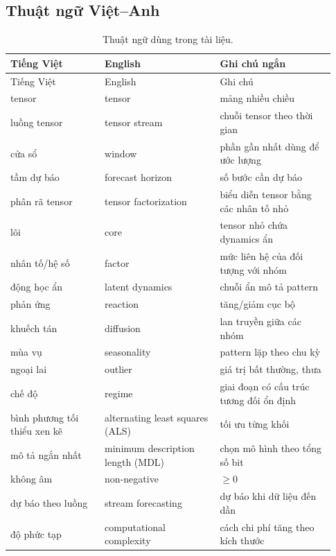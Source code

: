 \subsection*{Thuật ngữ Việt--Anh}

\begin{longtable}{@{}>{\raggedright\arraybackslash}p{0.27\linewidth}>{\raggedright\arraybackslash}p{0.33\linewidth}>{\raggedright\arraybackslash}p{0.33\linewidth}@{}}
  \caption{Thuật ngữ dùng trong tài liệu.}\label{tab:glossary}\\
  \toprule
  Tiếng Việt & English & Ghi chú ngắn \\
  \midrule
  \endfirsthead
  \toprule
  Tiếng Việt & English & Ghi chú \\
  \midrule
  \endhead
  tensor & tensor & mảng nhiều chiều \\
  luồng tensor & tensor stream & chuỗi tensor theo thời gian \\
  cửa sổ & window & phần gần nhất dùng để ước lượng \\
  tầm dự báo & forecast horizon & số bước cần dự báo \\
  phân rã tensor & tensor factorization & biểu diễn tensor bằng các nhân tố nhỏ \\
  lõi & core & tensor nhỏ chứa dynamics ẩn \\
  nhân tố/hệ số & factor & mức liên hệ của đối tượng với nhóm \\
  động học ẩn & latent dynamics & chuỗi ẩn mô tả pattern \\
  phản ứng & reaction & tăng/giảm cục bộ \\
  khuếch tán & diffusion & lan truyền giữa các nhóm \\
  mùa vụ & seasonality & pattern lặp theo chu kỳ \\
  ngoại lai & outlier & giá trị bất thường, thưa \\
  chế độ & regime & giai đoạn có cấu trúc tương đối ổn định \\
  bình phương tối thiểu xen kẽ & alternating least squares (ALS) & tối ưu từng khối \\
  mô tả ngắn nhất & minimum description length (MDL) & chọn mô hình theo tổng số bit \\
  không âm & non-negative & $\ge 0$ \\
  dự báo theo luồng & stream forecasting & dự báo khi dữ liệu đến dần \\
  độ phức tạp & computational complexity & cách chi phí tăng theo kích thước \\
  \bottomrule
\end{longtable}

